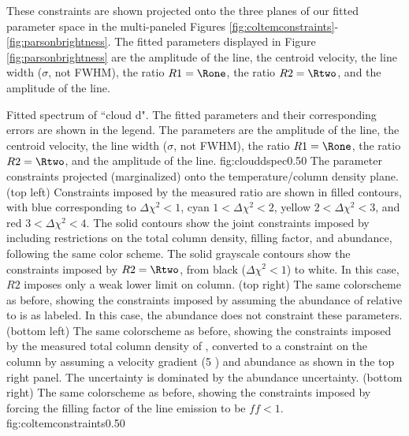 These constraints are shown projected onto the three planes of our fitted
parameter space in the multi-paneled Figures
\ref{fig:coltemconstraints}-\ref{fig:parsonbrightness}.  The fitted parameters
displayed in Figure \ref{fig:parsonbrightness} are the amplitude of the
\formaldehyde \threeohthree line, the centroid velocity, the line width
($\sigma$, not FWHM), the ratio $R1 = \Rone$,
the ratio $R2 = \Rtwo$, and the amplitude of
the \methanol \fourtwotwo line.

{Fitted spectrum of ``cloud d".  The fitted parameters and their corresponding
errors are shown in the legend.  The parameters are the amplitude of the
\formaldehyde \threeohthree line, the centroid velocity, the line width
($\sigma$, not FWHM), the ratio $R1 = \Rone$,
the ratio $R2 = \Rtwo$, and the amplitude of
the \methanol \fourtwotwo line.  }
{fig:clouddspec}{0.5}{0}
{The parameter constraints projected (marginalized) onto the temperature/column
density plane.\newline
(top left) Constraints imposed by the measured ratio \Rone are shown in filled contours,
with blue corresponding to $\Delta\chi^2 < 1$, cyan $1 < \Delta\chi^2 < 2$,
yellow $2 < \Delta\chi^2 < 3$, and red $3 < \Delta\chi^2 < 4$.  The solid
contours show the joint constraints imposed by including restrictions on the
total column density, filling factor, and abundance, following the same color
scheme.  The solid grayscale contours show the constraints imposed by
$R2=\Rtwo$, from black ($\Delta\chi^2 < 1$) to white.  In this case, $R2$
imposes only a weak lower limit on column. \newline
(top right) The same colorscheme as before, showing the constraints imposed by
assuming the abundance of \para relative to \hh is as labeled.  In this case,
the abundance does not constraint these parameters. \newline
(bottom left) The same colorscheme as before, showing the constraints imposed
by the measured total column density of \hh, converted to a constraint on the
\para column by assuming a velocity gradient (5 \kms \perpc) and abundance as
shown in the top right panel.  The uncertainty is dominated by the abundance
uncertainty.  \newline
(bottom right) The same colorscheme as before, showing the constraints imposed
by forcing the filling factor of the line emission to be $ff < 1$.
}
{fig:coltemconstraints}{0.5}{0}
